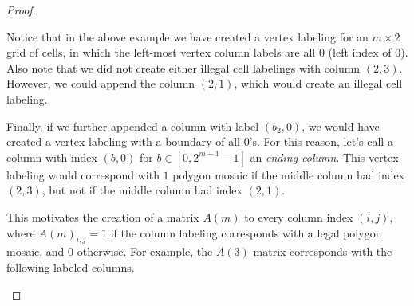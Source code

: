\begin{proof}
\begin{center}
\end{center}

Notice that in the above example we have created a vertex labeling for an $m \times 2$ grid of cells, in which the left-most vertex column labels are all $0$ (left index of $0$). Also note that we did not create either illegal cell labelings with column $(2,3)$. However, we could append the column $(2,1)$, which would create an illegal cell labeling. 

Finally, if we further appended a column with label $(b_2,0)$, we would have created a vertex labeling with a boundary of all $0$'s. For this reason, let's call a column with index $(b,0)$ for $b \in [0,2^{m-1}-1]$ an \textit{ending column}. This vertex labeling would correspond with $1$ polygon mosaic if the middle column had index $(2,3)$, but not if the middle column had index $(2,1)$.

This motivates the creation of a matrix $A(m)$ to every column index $(i,j)$, where $A(m)_{i,j}=1$ if the column labeling corresponds with a legal polygon mosaic, and $0$ otherwise. For example, the $A(3)$ matrix corresponds with the following labeled columns. 

\begin{center}
\end{center}
\end{proof}
